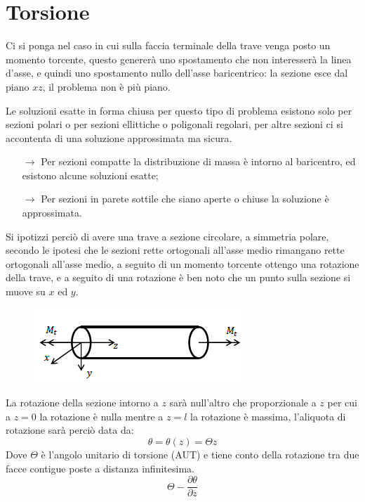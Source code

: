 
	
\section{Torsione}
		Ci si ponga nel caso in cui sulla faccia terminale della trave venga posto un momento torcente, questo genererà uno spostamento che non interesserà la linea d'asse, e quindi uno spostamento nullo dell'asse baricentrico: la sezione esce dal piano $xz$, il problema non è più piano. \newline 
		
		Le soluzioni esatte in forma chiusa per questo tipo di problema esistono solo per sezioni polari o per sezioni ellittiche o poligonali regolari, per altre sezioni ci si accontenta di una soluzione approssimata ma sicura. \newline 
		
		\begin{itemize}
			\item[$\rightarrow$] Per sezioni compatte la distribuzione di massa è intorno al baricentro, ed esistono alcune soluzioni esatte;
		\item[$\rightarrow$] Per sezioni in parete sottile che siano aperte o chiuse la soluzione è approssimata.
		\end{itemize} 
		
		Si ipotizzi perciò di avere una trave a sezione circolare, a simmetria polare, secondo le ipotesi che le sezioni rette ortogonali all'asse medio rimangano rette ortogonali all'asse medio, a seguito di un momento torcente ottengo una rotazione della trave, e a seguito di una rotazione è ben noto che un punto sulla sezione si muove su $x$ ed $y$.
		
\begin{figure}[H]
	\centering
	\includegraphics[width=0.5\linewidth]{immagini_5/screenshot008}
	\label{fig:screenshot008}
\end{figure}

		La rotazione della sezione intorno a $z$ sarà null'altro che proporzionale a $z$ per cui a $z=0$ la rotazione è nulla mentre a $z=l$ la rotazione è massima, l'aliquota di rotazione sarà perciò data da: 
		\[ \theta = \theta(z)= \Theta z\]
		Dove $\Theta$ è l'angolo unitario di torsione (AUT) e tiene conto della rotazione tra due facce contigue poste a distanza infinitesima.
		\[\Theta - \dfrac{\partial \theta}{\partial z}\]
		
